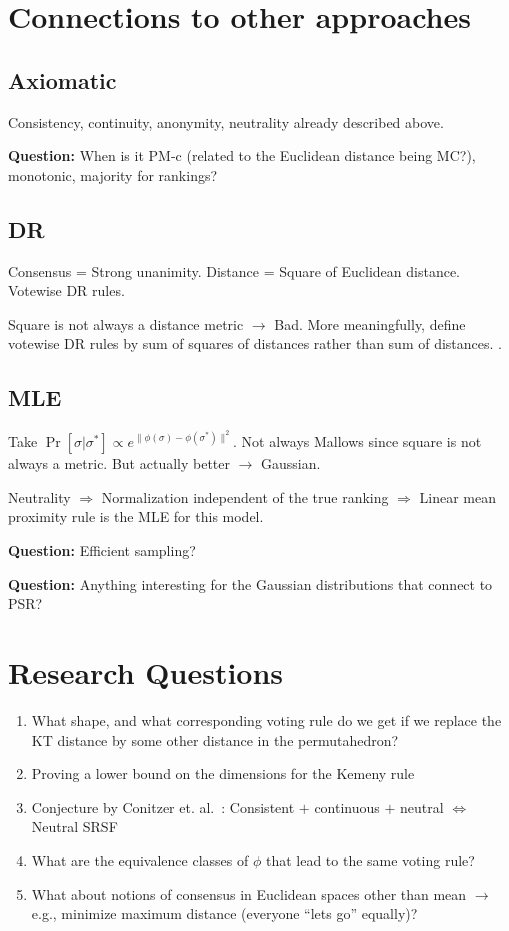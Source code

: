 \documentclass[10pt,letterpaper]{article}
\begin{document}
\section{Connections to other approaches}
\subsection{Axiomatic}
Consistency, continuity, anonymity, neutrality already described above. 

{\bf Question:} When is it PM-c (related to the Euclidean distance being MC?), monotonic, majority for rankings?

\subsection{DR}
Consensus = Strong unanimity. Distance = Square of Euclidean distance. Votewise DR rules. 

Square is not always a distance metric $\rightarrow$ Bad. More meaningfully, define votewise DR rules by sum of squares of distances rather than sum of distances. . 

\subsection{MLE}
Take $\Pr[\sigma | \sigma^*] \propto e^{\|\phi(\sigma)-\phi(\sigma^*)\|^2}$. Not always Mallows since square is not always a metric. But actually better $\rightarrow$ Gaussian. 

Neutrality $\Rightarrow$ Normalization independent of the true ranking $\Rightarrow$ Linear mean proximity rule is the MLE for this model. 

{\bf Question:} Efficient sampling?

{\bf Question:} Anything interesting for the Gaussian distributions that connect to PSR?

\section{Research Questions}
\begin{enumerate}
\item What shape, and what corresponding voting rule do we get if we replace the KT distance by some other distance in the permutahedron?
\item Proving a lower bound on the dimensions for the Kemeny rule
\item Conjecture by Conitzer et. al.~\cite{CRX09}: Consistent $+$ continuous $+$ neutral $\Leftrightarrow$ Neutral SRSF
\item What are the equivalence classes of $\phi$ that lead to the same voting rule?
\item What about notions of consensus in Euclidean spaces other than mean $\rightarrow$ e.g., minimize maximum distance (everyone ``lets go'' equally)?
\end{enumerate}


\begin{comment}
Mean proximity rule / generalized scoring rule / SRSF - Neutral $\Rightarrow$ SRSF iff MLE
{\bf Question:} (Linear) Mean Proximity Rules - Captures all ``pairwise comparison scoring rules''?
\end{comment}



\end{document}

